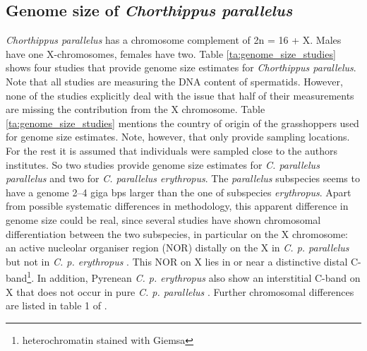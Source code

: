 \documentclass[a4paper,12pt,times,authoryear,twoside,print,index]{Classes/PhDThesisPSnPDF}\usepackage[]{graphicx}\usepackage[]{color}
\begin{document}
\FloatBarrier
\subsection{Genome size of \textit{Chorthippus parallelus}}\label{ch:Genome_size}

\textit{Chorthippus parallelus} has a chromosome complement of 2n = 16 + X. Males have one X-chromosomes, females have two. Table \ref{ta:genome_size_studies} shows four studies that provide genome size estimates for \textit{Chorthippus parallelus}. Note that all studies are measuring the DNA content of spermatids. However, none of the studies explicitly deal with the issue that half of their measurements are missing the contribution from the X chromosome. Table \ref{ta:genome_size_studies} mentions the country of origin of the grasshoppers used for genome size estimates. Note, however, that only \cite{Belda1991} provide sampling locations. For the rest it is assumed that individuals were sampled close to the authors institutes. So two studies provide genome size estimates for \textit{C. parallelus parallelus} and two for \textit{C. parallelus erythropus}. The \textit{parallelus} subspecies seems to have a genome 2--4 giga \glspl{bp} larger than the one of subspecies \textit{erythropus}. Apart from possible systematic differences in methodology, this apparent difference in genome size could be real, since several studies have shown chromosomal differentiation between the two subspecies, in particular on the X chromosome: an active nucleolar organiser region (NOR) distally on the X in \textit{C. p. parallelus} but not in \textit{C. p. erythropus} \citep{Gosalvez1988}. This NOR on X lies in or near a distinctive distal C-band\footnote{\gls{heterochromatin} stained with Giemsa}. In addition, Pyrenean \textit{C. p. erythropus} also show an interstitial C-band on X that does not occur in pure \textit{C. p. parallelus} \citep{Bella2007}. Further chromosomal differences are listed in table 1 of \cite{Ferris1993}.
\end{document}
